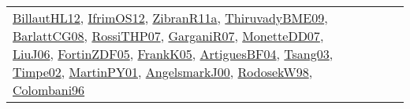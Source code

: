 {\begin{longtable}{lp{3cm}>{\raggedright}p{6cm}>{\raggedright}p{6cm}p{8cm}}
\href{papers/BillautHL12.pdf}{BillautHL12}\cite{BillautHL12}, \href{papers/IfrimOS12.pdf}{IfrimOS12}\cite{IfrimOS12}, \href{papers/ZibranR11a.pdf}{ZibranR11a}\cite{ZibranR11a}, \href{papers/ThiruvadyBME09.pdf}{ThiruvadyBME09}\cite{ThiruvadyBME09}, \href{papers/BarlattCG08.pdf}{BarlattCG08}\cite{BarlattCG08}, \href{papers/RossiTHP07.pdf}{RossiTHP07}\cite{RossiTHP07}, \href{papers/GarganiR07.pdf}{GarganiR07}\cite{GarganiR07}, \href{papers/MonetteDD07.pdf}{MonetteDD07}\cite{MonetteDD07}, \href{papers/LiuJ06.pdf}{LiuJ06}\cite{LiuJ06}, \href{papers/FortinZDF05.pdf}{FortinZDF05}\cite{FortinZDF05}, \href{papers/FrankK05.pdf}{FrankK05}\cite{FrankK05}, \href{papers/ArtiguesBF04.pdf}{ArtiguesBF04}\cite{ArtiguesBF04}, \href{articles/Tsang03.pdf}{Tsang03}\cite{Tsang03}, \href{articles/Timpe02.pdf}{Timpe02}\cite{Timpe02}, \href{articles/MartinPY01.pdf}{MartinPY01}\cite{MartinPY01}, \href{papers/AngelsmarkJ00.pdf}{AngelsmarkJ00}\cite{AngelsmarkJ00}, \href{papers/RodosekW98.pdf}{RodosekW98}\cite{RodosekW98}, \href{papers/Colombani96.pdf}{Colombani96}\cite{Colombani96}\\

\end{longtable}}
